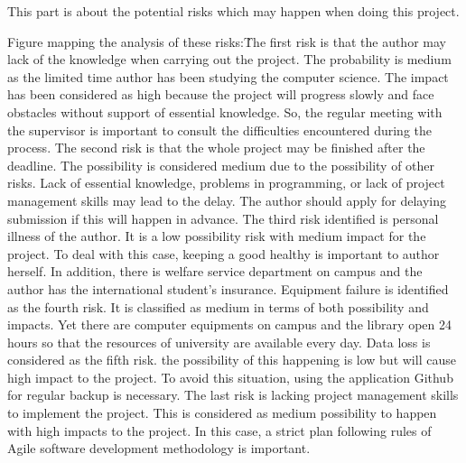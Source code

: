This part is about the potential risks which may happen when doing this project.

Figure \label{riskAnalysis} mapping the analysis of these risks:\.
The first risk is that the author may lack of the knowledge when carrying out the project. The probability is medium as the limited time author has been studying the computer science. The impact has been considered as high because the project will progress slowly and face obstacles without support of essential knowledge. So, the regular meeting with the supervisor is important to consult the difficulties encountered during the process.   
The second risk is that the whole project may be finished after the deadline. The possibility is considered medium due to the possibility of other risks. Lack of essential knowledge, problems in programming, or lack of project management skills may lead to the delay. The author should apply for delaying submission if this will happen in advance. 
The third risk identified is personal illness of the author. It is a low possibility risk with medium impact for the project. To deal with this case, keeping a good healthy is important to author herself. In addition, there is welfare service department on campus and the author has the international student’s insurance. 
Equipment failure is identified as the fourth risk. It is classified as medium in terms of both possibility and impacts. Yet there are computer equipments on campus and the library open 24 hours so that the resources of university are available every day. 
Data loss is considered as the fifth risk. the possibility of this happening is low but will cause high impact to the project. To avoid this situation, using the application Github for regular backup is necessary. 
The last risk is lacking project management skills to implement the project. This is considered as medium possibility to happen with high impacts to the project. In this case, a strict plan following rules of Agile software development methodology is important.

